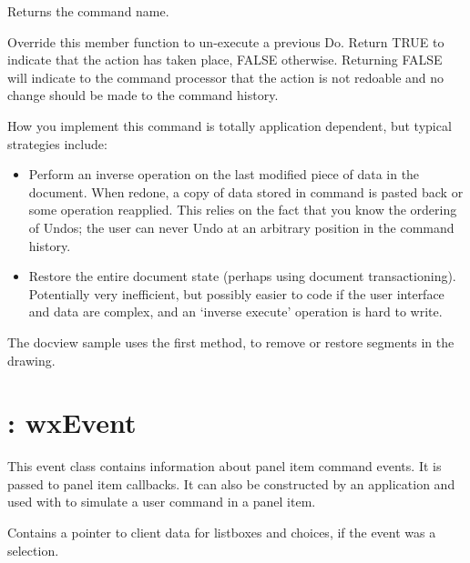 

Returns the command name.



Override this member function to un-execute a previous Do.
Return TRUE to indicate that the action has taken place, FALSE otherwise.
Returning FALSE will indicate to the command processor that the action is
not redoable and no change should be made to the command history.

How you implement this command is totally application dependent, but typical
strategies include:

\begin{itemize}\itemsep=0pt
\item Perform an inverse operation on the last modified piece of
data in the document. When redone, a copy of data stored in command
is pasted back or some operation reapplied. This relies on the fact that
you know the ordering of Undos; the user can never Undo at an arbitrary position
in the command history.
\item Restore the entire document state (perhaps using document transactioning).
Potentially very inefficient, but possibly easier to code if the user interface
and data are complex, and an `inverse execute' operation is hard to write.
\end{itemize}

The docview sample uses the first method, to remove or restore segments
in the drawing.

\section{: wxEvent}\label{wxcommandevent}

This event class contains information about panel item command events.
It is passed to  panel item callbacks. It
can also be constructed by an application and used with \rtfsp
to simulate a user command in a panel item.



Contains a pointer to client data for listboxes and choices, if the event
was a selection.

